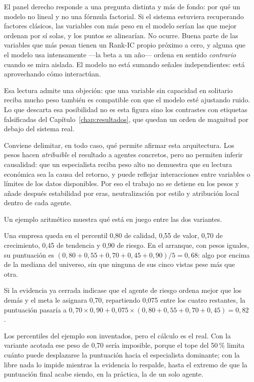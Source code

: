 El panel derecho responde a una pregunta distinta y más de fondo: por qué un modelo no lineal
y no una fórmula factorial. Si el sistema estuviera recuperando factores clásicos, las variables con
más peso en el modelo serían las que mejor ordenan por sí solas, y los puntos se alinearían. No
ocurre. Buena parte de las variables que más pesan tienen un Rank-IC propio próximo a cero, y alguna
que el modelo usa intensamente ---la beta a un año--- ordena en sentido \emph{contrario} cuando se
mira aislada. El modelo no está sumando señales independientes: está aprovechando cómo interactúan.

Esa lectura admite una objeción: que una variable sin capacidad en solitario reciba mucho peso
también es compatible con que el modelo esté ajustando ruido. Lo que descarta esa posibilidad no es
esta figura sino los contrastes con etiquetas falsificadas del Capítulo~\ref{chap:resultados}, que
quedan un orden de magnitud por debajo del sistema real.

Conviene delimitar, en todo caso, qué permite afirmar esta arquitectura. Los pesos hacen
\emph{atribuible} el resultado a agentes concretos, pero no permiten inferir causalidad: que un
especialista reciba peso alto no demuestra que su lectura económica sea la causa del retorno, y
puede reflejar interacciones entre variables o límites de los datos disponibles. Por eso el trabajo
no se detiene en los pesos y añade después estabilidad por eras, neutralización por estilo y
atribución local dentro de cada agente.

Un ejemplo aritmético muestra qué está en juego entre las dos variantes.

\begin{ejemplo}
Una empresa queda en el percentil 0,80 de calidad, 0,55 de valor, 0,70 de crecimiento, 0,45 de
tendencia y 0,90 de riesgo. En el arranque, con pesos iguales, su puntuación es
$(0{,}80+0{,}55+0{,}70+0{,}45+0{,}90)/5=0{,}68$: algo por encima de la mediana del universo, sin que
ninguna de sus cinco vistas pese más que otra.

Si la evidencia ya cerrada indicase que el agente de riesgo ordena mejor que los demás y el meta le
asignara 0,70, repartiendo 0,075 entre los cuatro restantes, la puntuación pasaría a
$0{,}70\times0{,}90 + 0{,}075\times(0{,}80+0{,}55+0{,}70+0{,}45) = 0{,}82$.
\end{ejemplo}

Los percentiles del ejemplo son inventados, pero el cálculo es el real. Con la variante acotada ese
peso de 0,70 sería imposible, porque el tope del 50\,\% limita cuánto puede desplazarse la
puntuación hacia el especialista dominante; con la libre nada lo impide mientras la evidencia lo
respalde, hasta el extremo de que la puntuación final acabe siendo, en la práctica, la de un solo
agente.
